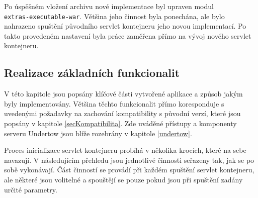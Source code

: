             Po úspěšném vložení archivu nové implementace byl upraven modul \\\texttt{extras-executable-war}.
            Většina jeho činnost byla ponechána, ale bylo nahrazeno spuštění původního servlet kontejneru
            jeho novou implementací. Po takto provedeném nastavení byla práce zaměřena přímo na vývoj
            nového servlet kontejneru. 

        


        \subsection{Realizace základních funkcionalit}
            V této kapitole jsou popsány klíčové části vytvořené aplikace a způsob jakým byly implementovány. Většina těchto
            funkcionalit přímo koresponduje s uvedenými požadavky na zachování kompatibility s původní verzí, 
            které jsou popsány v kapitole \ref{secKompatibilita}.
            Zde uváděné přístupy a komponenty serveru Undertow jsou blíže rozebrány v kapitole \ref{undertow}.

            Proces inicializace servlet kontejneru probíhá v několika krocích, které na sebe
            navazují. V následujícím přehledu jsou jednotlivé činnosti seřazeny tak, jak
            se po sobě vykonávají. 
            Část činností se provádí při každém spuštění servlet kontejneru,
            ale některé jsou volitelné a spouštějí se pouze pokud jsou při spuštění
            zadány určité parametry. 

